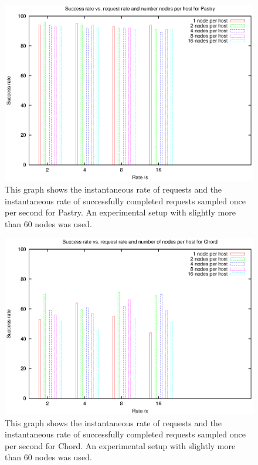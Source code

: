 \begin{figure}[!htb]
  \begin{center}
    \includegraphics[width=0.9\linewidth]{illustrations/success_rate_pastry.eps}
    \caption{This graph shows the instantaneous rate of requests and the instantaneous rate of successfully completed requests sampled once per second for Pastry. An experimental setup with slightly more than 60 nodes was used.}
    \label{figPastrySuccessRate}
  \end{center}
\end{figure}

\begin{figure}[!htb]
  \begin{center}
    \includegraphics[width=0.9\linewidth]{illustrations/success_rate_chord.eps}
    \caption{This graph shows the instantaneous rate of requests and the instantaneous rate of successfully completed requests sampled once per second for Chord. An experimental setup with slightly more than 60 nodes was used.}
    \label{figChordSuccessRate}
  \end{center}
\end{figure}

